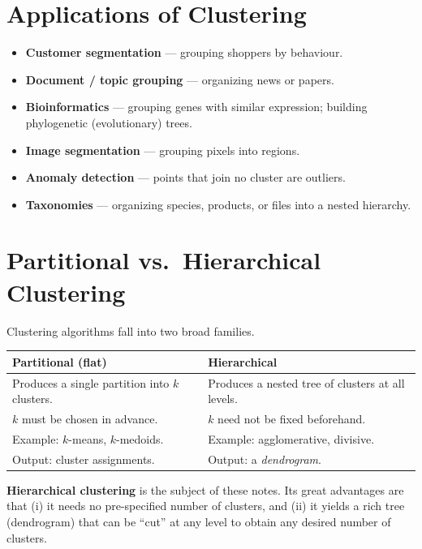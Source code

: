 \documentclass[11pt,a4paper]{report}
\theoremstyle{definition}
\theoremstyle{plain}
\theoremstyle{remark}
\begin{document}
\section{Applications of Clustering}
\begin{itemize}[nosep]
  \item \textbf{Customer segmentation} --- grouping shoppers by behaviour.
  \item \textbf{Document / topic grouping} --- organizing news or papers.
  \item \textbf{Bioinformatics} --- grouping genes with similar expression;
        building phylogenetic (evolutionary) trees.
  \item \textbf{Image segmentation} --- grouping pixels into regions.
  \item \textbf{Anomaly detection} --- points that join no cluster are outliers.
  \item \textbf{Taxonomies} --- organizing species, products, or files into a
        nested hierarchy.
\end{itemize}

\section{Partitional vs.\ Hierarchical Clustering}
Clustering algorithms fall into two broad families.
\begin{center}
\begin{tabular}{@{}p{6.4cm}p{6.4cm}@{}}
\toprule
\textbf{Partitional (flat)} & \textbf{Hierarchical}\\
\midrule
Produces a single partition into $k$ clusters. & Produces a nested tree of
clusters at all levels.\\
$k$ must be chosen in advance. & $k$ need not be fixed beforehand.\\
Example: $k$-means, $k$-medoids. & Example: agglomerative, divisive.\\
Output: cluster assignments. & Output: a \emph{dendrogram}.\\
\bottomrule
\end{tabular}
\end{center}

\noindent
\textbf{Hierarchical clustering} is the subject of these notes. Its great
advantages are that (i) it needs no pre-specified number of clusters, and
(ii) it yields a rich tree (dendrogram) that can be ``cut'' at any level to
obtain any desired number of clusters.

\end{document}
